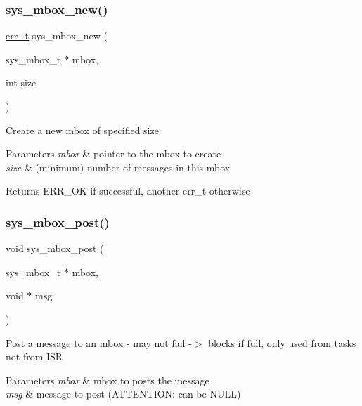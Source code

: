 \subsubsection{\texorpdfstring{sys\+\_\+mbox\+\_\+new()}{sys\_mbox\_new()}}
{\footnotesize\ttfamily \hyperlink{group__infrastructure__errors_gaf02d9da80fd66b4f986d2c53d7231ddb}{err\+\_\+t} sys\+\_\+mbox\+\_\+new (\begin{DoxyParamCaption}\item[{sys\+\_\+mbox\+\_\+t $\ast$}]{mbox,  }\item[{int}]{size }\end{DoxyParamCaption})}

Create a new mbox of specified size 
\begin{DoxyParams}{Parameters}
{\em mbox} & pointer to the mbox to create \\
\hline
{\em size} & (minimum) number of messages in this mbox \\
\hline
\end{DoxyParams}
\begin{DoxyReturn}{Returns}
E\+R\+R\+\_\+\+OK if successful, another err\+\_\+t otherwise 
\end{DoxyReturn}
\mbox{\label{group__sys__mbox_ga9d068386a3c53dd01b8af99c3ef77555}} 
\subsubsection{\texorpdfstring{sys\+\_\+mbox\+\_\+post()}{sys\_mbox\_post()}}
{\footnotesize\ttfamily void sys\+\_\+mbox\+\_\+post (\begin{DoxyParamCaption}\item[{sys\+\_\+mbox\+\_\+t $\ast$}]{mbox,  }\item[{void $\ast$}]{msg }\end{DoxyParamCaption})}

Post a message to an mbox -\/ may not fail -\/$>$ blocks if full, only used from tasks not from I\+SR 
\begin{DoxyParams}{Parameters}
{\em mbox} & mbox to posts the message \\
\hline
{\em msg} & message to post (A\+T\+T\+E\+N\+T\+I\+ON\+: can be N\+U\+LL) \\
\hline
\end{DoxyParams}
\mbox{\label{group__sys__mbox_ga53ddec9d7f5500c5b1d982cd17493172}} 

